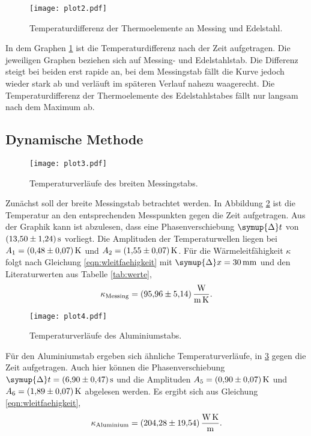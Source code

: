 %
\begin{figure}[H]
    \centering
    \texttt{[image: plot2.pdf]}
    \caption{Temperaturdifferenz der Thermoelemente an Messing und Edelstahl.}
    \label{fig:plot2}
\end{figure}
%
In dem Graphen \ref{fig:plot2} ist die Temperaturdifferenz nach der Zeit aufgetragen.
Die jeweiligen Graphen beziehen sich auf Messing- und Edelstahlstab.
Die Differenz steigt bei beiden erst rapide an, bei dem Messingstab fällt die Kurve jedoch
wieder stark ab und verläuft im späteren Verlauf nahezu waagerecht.
Die Temperaturdifferenz der Thermoelemente des Edelstahlstabes fällt nur langsam nach dem Maximum ab.
%
\subsection{Dynamische Methode}
\begin{figure}
    \centering
    \texttt{[image: plot3.pdf]}
    \caption{Temperaturverläufe des breiten Messingstabs.}
    \label{fig:plot3}
\end{figure}
%
Zunächst soll der breite Messingstab betrachtet werden.
In Abbildung \ref{fig:plot3} ist die Temperatur an den entsprechenden Messpunkten gegen die Zeit aufgetragen.
Aus der Graphik kann ist abzulesen, dass eine Phasenverschiebung $\symup{\Delta} t$ von
$\SI{13.50\pm1.24}{\second}$ vorliegt. Die Amplituden der Temperaturwellen liegen
bei $A_1 = \SI{0.48\pm0.07}{\kelvin}$ und $A_2 = \SI{1.55\pm0.07}{\kelvin}$.
Für die Wärmeleitfähigkeit $\kappa$ folgt nach Gleichung \eqref{eqn:wleitfaehigkeit} mit
$\symup{\Delta}x = \SI{30}{\milli\meter}$ und den Literaturwerten aus Tabelle \ref{tab:werte},
\begin{equation*}
\kappa_\text{Messing} = \SI{95.96\pm 5.14}{\watt\per\meter\per\kelvin} .
\end{equation*}
%
\begin{figure}
    \centering
    \texttt{[image: plot4.pdf]}
    \caption{Temperaturverläufe des Aluminiumstabs.}
    \label{fig:plot4}
\end{figure}
%
Für den Aluminiumstab ergeben sich ähnliche Temperaturverläufe, in \ref{fig:plot4} gegen die Zeit aufgetragen.
Auch hier können die Phasenverschiebung $\symup{\Delta} t = \SI{6.90\pm0.47}{\second}$
und die Amplituden $A_5 = \SI{0.9\pm0.07}{\kelvin}$ und $A_6 = \SI{1.89\pm0.07}{\kelvin}$
abgelesen werden. Es ergibt sich aus Gleichung \eqref{eqn:wleitfaehigkeit},
\begin{equation*}
\kappa_\text{Aluminium} = \SI{204.28\pm 19.54}{\watt\per\meter\kelvin} .
\end{equation*}
